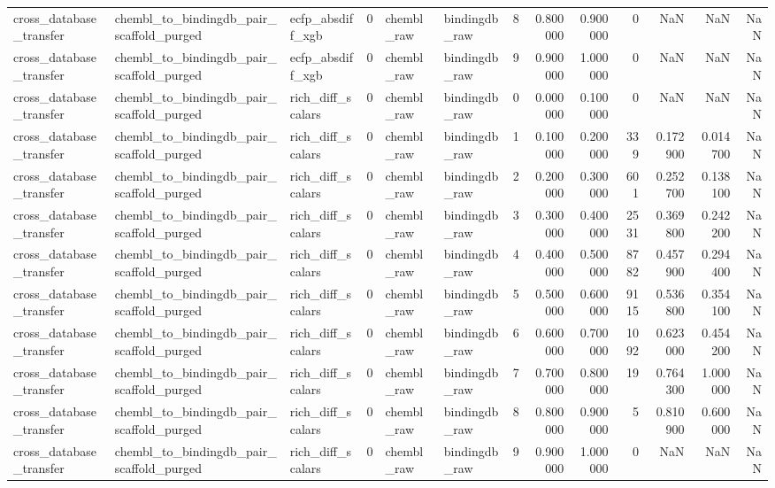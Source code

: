 \begin{longtable}{lllrllrrrrrrr}
cross\_database\_transfer & chembl\_to\_bindingdb\_pair\_scaffold\_purged & ecfp\_absdiff\_xgb & 0 & chembl\_raw & bindingdb\_raw & 8 & 0.800000 & 0.900000 & 0 & NaN & NaN & NaN \\
cross\_database\_transfer & chembl\_to\_bindingdb\_pair\_scaffold\_purged & ecfp\_absdiff\_xgb & 0 & chembl\_raw & bindingdb\_raw & 9 & 0.900000 & 1.000000 & 0 & NaN & NaN & NaN \\
cross\_database\_transfer & chembl\_to\_bindingdb\_pair\_scaffold\_purged & rich\_diff\_scalars & 0 & chembl\_raw & bindingdb\_raw & 0 & 0.000000 & 0.100000 & 0 & NaN & NaN & NaN \\
cross\_database\_transfer & chembl\_to\_bindingdb\_pair\_scaffold\_purged & rich\_diff\_scalars & 0 & chembl\_raw & bindingdb\_raw & 1 & 0.100000 & 0.200000 & 339 & 0.172900 & 0.014700 & NaN \\
cross\_database\_transfer & chembl\_to\_bindingdb\_pair\_scaffold\_purged & rich\_diff\_scalars & 0 & chembl\_raw & bindingdb\_raw & 2 & 0.200000 & 0.300000 & 601 & 0.252700 & 0.138100 & NaN \\
cross\_database\_transfer & chembl\_to\_bindingdb\_pair\_scaffold\_purged & rich\_diff\_scalars & 0 & chembl\_raw & bindingdb\_raw & 3 & 0.300000 & 0.400000 & 2531 & 0.369800 & 0.242200 & NaN \\
cross\_database\_transfer & chembl\_to\_bindingdb\_pair\_scaffold\_purged & rich\_diff\_scalars & 0 & chembl\_raw & bindingdb\_raw & 4 & 0.400000 & 0.500000 & 8782 & 0.457900 & 0.294400 & NaN \\
cross\_database\_transfer & chembl\_to\_bindingdb\_pair\_scaffold\_purged & rich\_diff\_scalars & 0 & chembl\_raw & bindingdb\_raw & 5 & 0.500000 & 0.600000 & 9115 & 0.536800 & 0.354100 & NaN \\
cross\_database\_transfer & chembl\_to\_bindingdb\_pair\_scaffold\_purged & rich\_diff\_scalars & 0 & chembl\_raw & bindingdb\_raw & 6 & 0.600000 & 0.700000 & 1092 & 0.623000 & 0.454200 & NaN \\
cross\_database\_transfer & chembl\_to\_bindingdb\_pair\_scaffold\_purged & rich\_diff\_scalars & 0 & chembl\_raw & bindingdb\_raw & 7 & 0.700000 & 0.800000 & 19 & 0.764300 & 1.000000 & NaN \\
cross\_database\_transfer & chembl\_to\_bindingdb\_pair\_scaffold\_purged & rich\_diff\_scalars & 0 & chembl\_raw & bindingdb\_raw & 8 & 0.800000 & 0.900000 & 5 & 0.810900 & 0.600000 & NaN \\
cross\_database\_transfer & chembl\_to\_bindingdb\_pair\_scaffold\_purged & rich\_diff\_scalars & 0 & chembl\_raw & bindingdb\_raw & 9 & 0.900000 & 1.000000 & 0 & NaN & NaN & NaN \\

\end{longtable}

